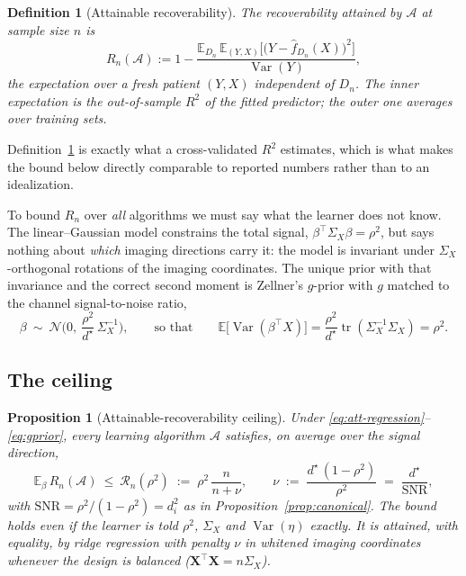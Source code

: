 \documentclass{article}
\newtheorem{proposition}{Proposition}
\newtheorem{definition}{Definition}
\newcommand{\E}{\mathbb{E}}
\newcommand{\N}{\mathcal{N}}
\newcommand{\Var}{\operatorname{Var}}
\newcommand{\tr}{\operatorname{tr}}
\newcommand{\Sx}{\Sigma_{X}}
\newcommand{\T}{^{\top}}
\begin{document}
\begin{definition}[Attainable recoverability]
\label{def:attainable}
The recoverability \emph{attained} by $\mathcal{A}$ at sample size $n$ is
\begin{equation}
R_n(\mathcal{A})
:= 1 - \frac{\E_{D_n}\,\E_{(Y,X)}\big[\big(Y-\hat f_{D_n}(X)\big)^2\big]}{\Var(Y)},
\label{eq:def-attainable}
\end{equation}
the expectation over a fresh patient $(Y,X)$ independent of $D_n$. The inner
expectation is the out-of-sample $R^2$ of the fitted predictor; the outer one
averages over training sets.
\end{definition}

Definition~\ref{def:attainable} is exactly what a cross-validated $R^2$
estimates, which is what makes the bound below directly comparable to reported
numbers rather than to an idealization.

To bound $R_n$ over \emph{all} algorithms we must say what the learner does not
know. The linear--Gaussian model constrains the total signal,
$\beta\T\Sx\beta=\rho^2$, but says nothing about \emph{which} imaging directions
carry it: the model is invariant under $\Sx$-orthogonal rotations of the imaging
coordinates. The unique prior with that invariance and the correct second moment
is Zellner's $g$-prior with $g$ matched to the channel signal-to-noise ratio,
\begin{equation}
\beta\ \sim\ \N\!\Big(0,\ \frac{\rho^2}{d^\star}\,\Sx^{-1}\Big),
\qquad\text{so that}\qquad
\E\big[\Var(\beta\T X)\big] = \frac{\rho^2}{d^\star}\tr(\Sx^{-1}\Sx) = \rho^2 .
\label{eq:gprior}
\end{equation}

\subsection{The ceiling}

\begin{proposition}[Attainable-recoverability ceiling]
\label{prop:attainable}
Under \eqref{eq:att-regression}--\eqref{eq:gprior}, every learning algorithm
$\mathcal{A}$ satisfies, on average over the signal direction,
\begin{equation}
\boxed{\;
\E_{\beta}\,R_n(\mathcal{A})\ \le\ \mathcal{R}_n(\rho^2)
\;:=\; \rho^2\,\frac{n}{n+\nu},
\qquad
\nu \;:=\; \frac{d^\star\,(1-\rho^2)}{\rho^2} \;=\; \frac{d^\star}{\mathrm{SNR}},
\;}
\label{eq:attainable}
\end{equation}
with $\mathrm{SNR}=\rho^2/(1-\rho^2)=d_i^2$ as in
Proposition~\ref{prop:canonical}. The bound holds even if the learner is told
$\rho^2$, $\Sx$ and $\Var(\eta)$ exactly. It is attained, with equality, by
ridge regression with penalty $\nu$ in whitened imaging coordinates whenever the
design is balanced ($\mathbf{X}\T\mathbf{X}=n\Sx$).
\end{proposition}
\end{document}
